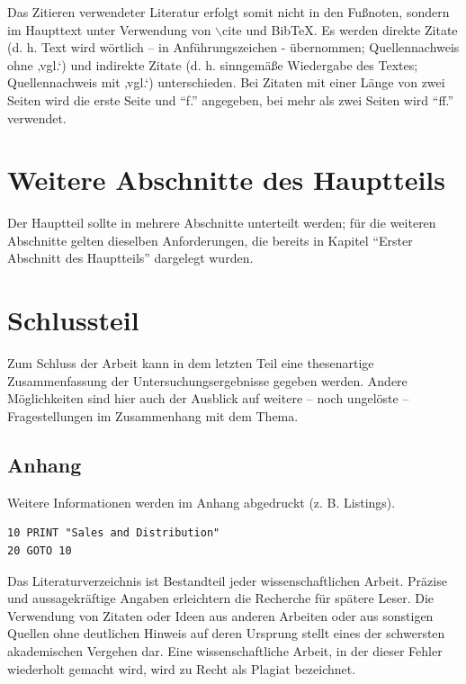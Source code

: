 \documentclass[11pt]{scrartcl}
\begin{document}
Das Zitieren verwendeter Literatur erfolgt somit nicht in den Fußnoten, sondern im Haupttext unter Verwendung von $\backslash$cite und BibTeX. Es werden direkte Zitate (d. h. Text wird wörtlich – in Anführungszeichen - übernommen; Quellennachweis ohne ‚vgl.‘) und indirekte Zitate (d. h. sinngemäße Wiedergabe des Textes; Quellennachweis mit ‚vgl.‘) unterschieden. Bei Zitaten mit einer Länge von zwei Seiten wird die erste Seite und "`f."' angegeben, bei mehr als zwei Seiten wird "`ff."' verwendet. 

\section{Weitere Abschnitte des Hauptteils}
Der Hauptteil sollte in mehrere Abschnitte unterteilt werden; für die weiteren Abschnitte gelten dieselben Anforderungen, die bereits in Kapitel "`Erster Abschnitt des Hauptteils"' dargelegt wurden.

\section{Schlussteil}
Zum Schluss der Arbeit kann in dem letzten Teil eine thesenartige Zusammenfassung der Untersuchungsergebnisse gegeben werden. Andere Möglichkeiten sind hier auch der Ausblick auf weitere – noch ungelöste – Fragestellungen im Zusammenhang mit dem Thema.



\begin{appendix}

\section{Anhang}
Weitere Informationen werden im Anhang abgedruckt (z. B. Listings).

\begin{verbatim}
10 PRINT "Sales and Distribution"
20 GOTO 10
\end{verbatim}

\newpage
Das Literaturverzeichnis ist Bestandteil jeder wissenschaftlichen Arbeit. Präzise und aussagekräftige Angaben erleichtern die Recherche für spätere Leser. Die Verwendung von Zitaten oder Ideen aus anderen Arbeiten oder aus sonstigen Quellen ohne deutlichen Hinweis auf deren Ursprung stellt eines der schwersten akademischen Vergehen dar. Eine wissenschaftliche Arbeit, in der dieser Fehler wiederholt gemacht wird, wird zu Recht als Plagiat bezeichnet.


\end{appendix}
\end{document}
